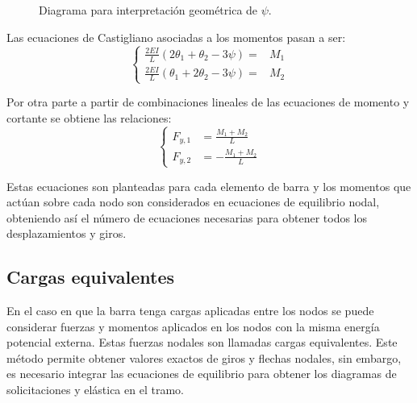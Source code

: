 \begin{figure}[htb]
	\centering
	\def\svgwidth{0.65\textwidth}
	
	\caption{Diagrama para interpretación geométrica de $\psi$.}
	\label{fig:psi}
\end{figure}


Las ecuaciones de Castigliano asociadas a los momentos pasan a ser: %
%
\begin{equation}\label{eqn:eqvig}
\left\{
\begin{array}{rl}
\displaystyle
\frac{2 EI}{L} \left( 2 \theta_1  + \theta_2 - 3 \psi   \right) =& M_1 \\[3mm]
\displaystyle
\frac{2 EI}{L} \left( \theta_1 + 2  \theta_2 - 3 \psi  \right) =& M_2
\end{array}
\right.
\end{equation}

Por otra parte a partir de combinaciones lineales de las ecuaciones de momento y cortante se obtiene las relaciones:
%
\begin{equation}
\left\{
\begin{array}{rl}
\displaystyle
F_{y,1} & \displaystyle
 = \frac{M_1 + M_2}{L} \\[5mm]
\displaystyle
F_{y,2} & \displaystyle
 = -\frac{M_1 + M_2}{L} 
\end{array}
\right.
\end{equation}

Estas ecuaciones son planteadas para cada elemento de barra y los momentos que actúan sobre cada nodo son considerados en ecuaciones de equilibrio nodal, obteniendo así el número de ecuaciones necesarias para obtener todos los desplazamientos y giros.




\subsection{Cargas equivalentes}

En el caso en que la barra tenga cargas aplicadas entre los nodos se puede considerar fuerzas y momentos aplicados en los nodos con la misma energía potencial externa. %
%
Estas fuerzas nodales son llamadas cargas equivalentes. %
%
Este método permite obtener valores exactos de giros y flechas nodales, sin embargo, es necesario integrar las ecuaciones de equilibrio para obtener los diagramas de solicitaciones  y elástica en el tramo.

%
%

